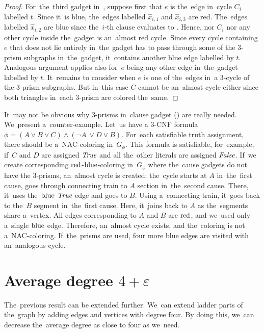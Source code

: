 \begin{proof}
	For~the~third gadget in~,
	suppose first that $e$ is the~edge in~cycle $C_i$ labelled $t$.
	Since it~is blue, the~edges labelled $\hat{x}_{i,1}$ and $\hat{x}_{i,3}$ are red.
	The~edges labelled $\hat{x}_{i,2}$ are blue since the~$i$-th clause evaluates to \true{}.
	Hence, nor $C_i$ nor any other cycle inside the~gadget is an~almost red cycle.
	Since every cycle containing $e$ that does not lie entirely in~the~gadget
	has to pass through some of the 3-prism subgraphs in~the~gadget, it~contains another blue edge labelled by $t$.
	Analogous argument applies also for~$e$ being any other edge in~the~gadget labelled by $t$.
	It~remains to consider when $e$ is one of the~edges in~a 3-cycle of the 3-prism subgraphs.
	But in~this case $C$ cannot be an~almost cycle either since both triangles in~each 3-prism are colored the~same.
\end{proof}

It~may not be obvious why 3-prisms in~clause gadget
()
are really needed. We~present a~counter-example.
Let~us have a 3-CNF formula~\( \phi = (A \lor B \lor C) \land (\lnot A~\lor D \lor B) \).
For~each satisfiable truth assignment, there should be a~NAC-coloring in~\( G_\phi \).
%
This formula is satisfiable, for~example, if~\( C \) and \( D \) are assigned \( \textit{True} \)
and all the~other literals are assigned \( \textit{False} \).
If~we create corresponding \( \text{red} \)-\( \text{blue} \)-coloring in~\( G_\phi \)
where the~cause gadgets do not have the 3-prisms, an~almost cycle is created:
%
the~cycle starts at \( A \) in~the~first cause, goes through connecting
train to \( A \) section in~the~second cause. There, it~uses the~\( \text{blue} \)
\( \textit{True} \) edge and goes to \( B \). Using a~connecting train,
it~goes back to the~\( B \) segment in~the~first cause.
Here, it~joins back to \( A \) as the~segments share a~vertex.
All edges corresponding to \( A \) and \( B \)
are \( \text{red} \), and we~used only a~single \( \text{blue} \) edge.
Therefore, an~almost cycle exists, and the~coloring is not a~NAC-coloring.
If~the~prisms are used, four more blue edges are visited with an~analogous cycle.


\section{Average degree \( 4 + \varepsilon \)}

The~previous result can be extended further.
We~can extend ladder parts of the~graph by adding
edges and vertices with degree four.
By doing this, we~can decrease the~average degree as close to four as we~need.

